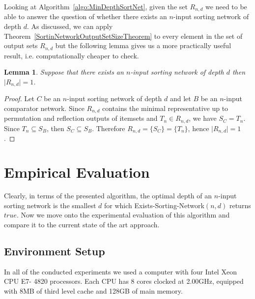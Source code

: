 \documentclass[13pt,a4paper]{article}
\newtheorem{lemma}[theorem]{Lemma}
\begin{document}
Looking at Algorithm~\ref{algo:MinDepthSortNet}, given the set $R_{n,d}$ we need to be able to answer the question of whether there exists an $n$-input sorting network of depth $d$. As discussed, we can apply Theorem~\ref{SortinNetworkOutputSetSizeTheorem} to every element in the set of output sets $R_{n,d}$ but the following lemma gives us a more practically useful result, i.e. computationally cheaper to check.

\begin{lemma}
\label{AlgoCorrectExistanceLemma}
Suppose that there exists an $n$-input sorting network of depth $d$ then $ \lvert R_{n,d} \lvert = 1 $.
\end{lemma}

\begin{proof}
Let $C$ be an $n$-input sorting network of depth $d$ and let $B$ be an $n$-input comparator network. Since $R_{n,d}$ contains the minimal representative up to permutation and reflection outputs of itemsets and $T_n \in R_{n, d}$, we have $S_C = T_n$. Since $T_n \subseteq S_B$, then $S_C \subseteq S_B$. Therefore $R_{n,d} = \{ S_C \} = \{ T_n \}$, hence $ \lvert R_{n,d} \lvert = 1 $.
\end{proof}





\section{Empirical Evaluation}
\label{sec:experiments}

Clearly, in terms of the presented algorithm, the optimal depth of an $n$-input sorting network is the smallest $d$ for which Exists-Sorting-Network$(n,d)$ returns $true$. Now we move onto the experimental evaluation of this algorithm and compare it to the current state of the art approach.

\subsection{Environment Setup}
In all of the conducted experiments we used a computer with four Intel Xeon CPU E7- 4820 processors. Each CPU has 8 cores clocked at 2.00GHz, equipped with 8MB of third level cache and 128GB of main memory.
\end{document}

